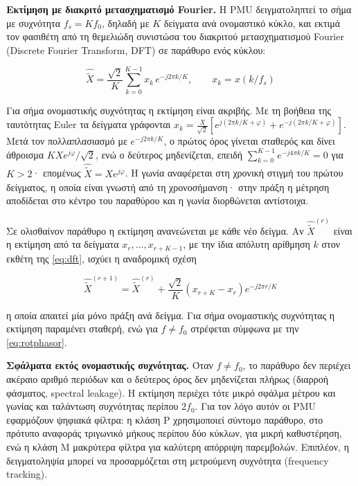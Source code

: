 \textbf{Εκτίμηση με διακριτό μετασχηματισμό Fourier.} Η PMU δειγματοληπτεί το σήμα με
συχνότητα $f_s = K f_0$, δηλαδή με $K$ δείγματα ανά ονομαστικό κύκλο, και εκτιμά τον
φασιθέτη από τη θεμελιώδη συνιστώσα του διακριτού μετασχηματισμού Fourier (Discrete Fourier
Transform, DFT) σε παράθυρο ενός κύκλου:

\begin{equation}
\hat{\tilde{X}} = \frac{\sqrt{2}}{K} \sum_{k=0}^{K-1} x_k\, e^{-j 2\pi k / K},
\qquad x_k = x(k/f_s)
\label{eq:dft}
\end{equation}

Για σήμα ονομαστικής συχνότητας η εκτίμηση είναι ακριβής. Με τη βοήθεια της ταυτότητας
Euler τα δείγματα γράφονται
$x_k = \frac{X}{\sqrt{2}}\left[e^{j(2\pi k/K + \varphi)} + e^{-j(2\pi k/K + \varphi)}\right]$.
Μετά τον πολλαπλασιασμό με $e^{-j2\pi k/K}$, ο πρώτος όρος γίνεται σταθερός και δίνει
άθροισμα $K X e^{j\varphi}/\sqrt{2}$, ενώ ο δεύτερος μηδενίζεται, επειδή
$\sum_{k=0}^{K-1} e^{-j4\pi k/K} = 0$ για $K > 2$· επομένως $\hat{\tilde{X}} = X e^{j\varphi}$.
Η γωνία αναφέρεται στη χρονική στιγμή του πρώτου δείγματος, η οποία είναι γνωστή από τη
χρονοσήμανση· στην πράξη η μέτρηση αποδίδεται στο κέντρο του παραθύρου και η γωνία
διορθώνεται αντίστοιχα.

Σε ολισθαίνον παράθυρο η εκτίμηση ανανεώνεται με κάθε νέο δείγμα. Αν $\hat{\tilde{X}}^{(r)}$
είναι η εκτίμηση από τα δείγματα $x_r, \ldots, x_{r+K-1}$, με την ίδια απόλυτη αρίθμηση
$k$ στον εκθέτη της \eqref{eq:dft}, ισχύει η αναδρομική σχέση

\begin{equation}
\hat{\tilde{X}}^{(r+1)} = \hat{\tilde{X}}^{(r)}
+ \frac{\sqrt{2}}{K}\left(x_{r+K} - x_r\right) e^{-j2\pi r/K}
\label{eq:recdft}
\end{equation}

η οποία απαιτεί μία μόνο πράξη ανά δείγμα. Για σήμα ονομαστικής συχνότητας η εκτίμηση
παραμένει σταθερή, ενώ για $f \neq f_0$ στρέφεται σύμφωνα με την \eqref{eq:rotphasor}.

\textbf{Σφάλματα εκτός ονομαστικής συχνότητας.} Όταν $f \neq f_0$, το παράθυρο δεν περιέχει
ακέραιο αριθμό περιόδων και ο δεύτερος όρος δεν μηδενίζεται πλήρως (διαρροή φάσματος,
spectral leakage). Η εκτίμηση περιέχει τότε μικρό σφάλμα μέτρου και γωνίας και ταλάντωση
συχνότητας περίπου $2f_0$. Για τον λόγο αυτόν οι PMU εφαρμόζουν ψηφιακά φίλτρα: η κλάση P
χρησιμοποιεί σύντομο παράθυρο, στο πρότυπο αναφοράς τριγωνικό μήκους περίπου δύο κύκλων, για
μικρή καθυστέρηση, ενώ η κλάση M μακρύτερα φίλτρα για καλύτερη απόρριψη παρεμβολών.
Επιπλέον, η δειγματοληψία μπορεί να προσαρμόζεται στη μετρούμενη συχνότητα (frequency
tracking).


